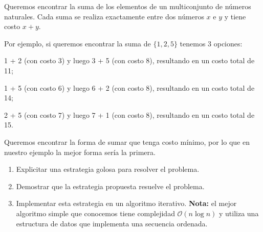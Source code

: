 


\item Queremos encontrar la suma de los elementos de un multiconjunto de números naturales. Cada suma se realiza exactamente entre dos números $x$ e $y$ y tiene costo $x + y$.
\par{Por ejemplo, si queremos encontrar la suma de $\{ 1, 2, 5 \}$ tenemos 3 opciones:}
\item 1 + 2 (con costo 3) y luego 3 + 5 (con costo 8), resultando en un costo total de 11;
\item 1 + 5 (con costo 6) y luego 6 + 2 (con costo 8), resultando en un costo total de 14;
\item 2 + 5 (con costo 7) y luego 7 + 1 (con costo 8), resultando en un costo total de 15.
\par{Queremos encontrar la forma de sumar que tenga costo mínimo, por lo que en nuestro ejemplo la mejor forma sería la primera.}

\begin{enumerate}
 \item Explicitar una estrategia golosa para resolver el problema.
 \item Demostrar que la estrategia propuesta resuelve el problema.
 \item Implementar esta estrategia en un algoritmo iterativo.  \textbf{Nota:} el mejor algoritmo simple que conocemos tiene complejidad $\mathcal{O}(n\log n)$ y utiliza una estructura de datos que implementa una secuencia ordenada.
\end{enumerate}

